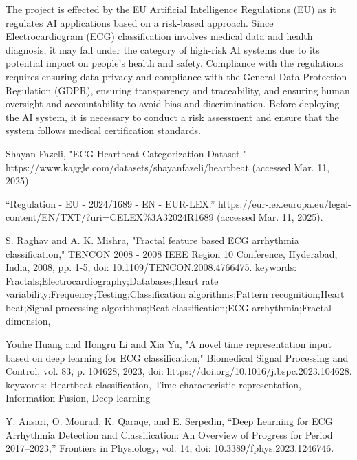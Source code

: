 \documentclass[conference]{IEEEtran}
\begin{document}
The project is effected by the EU Artificial Intelligence Regulations (EU) \cite{b2} as it regulates AI applications based on a risk-based approach. Since Electrocardiogram (ECG) classification involves medical data and health diagnosis, it may fall under the category of high-risk AI systems due to its potential impact on people's health and safety. Compliance with the regulations requires ensuring data privacy and compliance with the General Data Protection Regulation (GDPR), ensuring transparency and traceability, and ensuring human oversight and accountability to avoid bias and discrimination. Before deploying the AI system, it is necessary to conduct a risk assessment and ensure that the system follows medical certification standards. 














\begin{thebibliography}{00}
     Shayan Fazeli, "ECG Heartbeat Categorization Dataset."  https://www.kaggle.com/datasets/shayanfazeli/heartbeat (accessed Mar. 11, 2025).

     “Regulation - EU - 2024/1689 - EN - EUR-LEX.” https://eur-lex.europa.eu/legal-content/EN/TXT/?uri=CELEX\%3A32024R1689 (accessed Mar. 11, 2025).

     S. Raghav and A. K. Mishra, "Fractal feature based ECG arrhythmia classification," TENCON 2008 - 2008 IEEE Region 10 Conference, Hyderabad, India, 2008, pp. 1-5, doi: 10.1109/TENCON.2008.4766475. keywords: {Fractals;Electrocardiography;Databases;Heart rate variability;Frequency;Testing;Classification algorithms;Pattern recognition;Heart beat;Signal processing algorithms;Beat classification;ECG arrhythmia;Fractal dimension},

     Youhe Huang and Hongru Li and Xia Yu, "A novel time representation input based on deep learning for ECG classification," Biomedical Signal Processing and Control, vol. 83, p. 104628, 2023, doi: https://doi.org/10.1016/j.bspc.2023.104628. keywords: {Heartbeat classification, Time characteristic representation, Information Fusion, Deep learning}

     Y. Ansari, O. Mourad, K. Qaraqe, and E. Serpedin, “Deep Learning for ECG Arrhythmia Detection and Classification: An Overview of Progress for Period 2017–2023,” Frontiers in Physiology, vol. 14, doi: 10.3389/fphys.2023.1246746.
\end{thebibliography}
\end{document}
